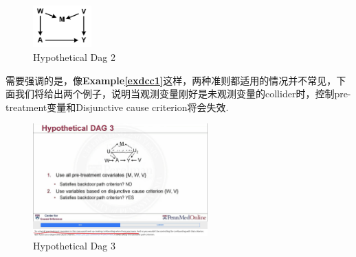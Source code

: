 \begin{figure}[htbp]
	\setlength{\abovecaptionskip}{0pt}     %
	\setlength{\belowcaptionskip}{10pt}
	\vspace{-0cm}  %
	\setlength{\abovecaptionskip}{-0cm}   %
	\setlength{\belowcaptionskip}{-0cm}   %
	\centering
	\includegraphics[width=0.2\textwidth]{figure/exdcc.png}
	\caption{Hypothetical Dag 2}
	\label{exdcc}
\end{figure}

需要强调的是，像{\bfseries Example\ref{exdcc1}}这样，两种准则都适用的情况并不常见，下面我们将给出两个例子，说明当观测变量刚好是未观测变量的collider时，控制pre-treatment变量和Disjunctive cause criterion将会失效. 
\begin{figure}[htbp]
	\setlength{\abovecaptionskip}{0pt}     %
	\setlength{\belowcaptionskip}{10pt}
	\vspace{-0cm}  %
	\setlength{\abovecaptionskip}{-0cm}   %
	\setlength{\belowcaptionskip}{-0cm}   %
	\centering
	\includegraphics[width=0.6\textwidth]{figure/dccdag3.jpg}
	\caption{Hypothetical Dag 3}
	\label{dccdag3}
\end{figure}
	
